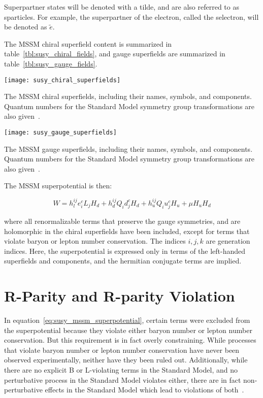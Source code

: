 Superpartner states will be denoted with a tilde, and are also referred to as sparticles.
For example, the superpartner of the electron, called the selectron, will be denoted as $\tilde{e}$.

The MSSM chiral superfield content is summarized in table~\ref{tbl:susy_chiral_fields},
and gauge superfields are summarized in table~\ref{tbl:susy_gauge_fields}.

\begin{table}[!ht]
    \centering
  \texttt{[image: susy\_chiral\_superfields]}
    \caption{The MSSM chiral superfields, including their names, symbols, and components.
  Quantum numbers for the Standard Model symmetry group transformations are also given~\cite{susy-primer-1998}.}
    \label{tbl:susy_chiral_fields}
\end{table}

\begin{table}[!ht]
    \centering

  \texttt{[image: susy\_gauge\_superfields]}
    \caption{The MSSM gauge superfields, including their names, symbols, and components.
  Quantum numbers for the Standard Model symmetry group transformations are also given~\cite{susy-primer-1998}.}\label{tbl:susy_gauge_fields}
\end{table}

The MSSM superpotential is then:

\begin{equation}\label{eq:susy_mssm_superpotential}
    W = h_l^{ij} e_i^c L_j H_d + h_d^{ij} Q_i d_j^c H_d + h_u^{ij} Q_i u_j^c H_u + \mu H_u H_d
\end{equation}

\noindent where all renormalizable terms that preserve the gauge symmetries, and are holomorphic in the chiral superfields have been included,
except for terms that violate baryon or lepton number conservation.
The indices $i, j, k$ are generation indices.
Here, the superpotential is expressed only in terms of the left-handed superfields and components,
and the hermitian conjugate terms are implied.

\section{R-Parity and R-parity Violation}\label{sec:susy_rpv}

In equation~\ref{eq:susy_mssm_superpotential}, certain terms were excluded from the superpotential because they
violate either baryon number or lepton number conservation.
But this requirement is in fact overly constraining.
While processes that violate baryon number or lepton number conservation have never been observed experimentally,
neither have they been ruled out.
Additionally, while there are no explicit B or L-violating terms in the Standard Model,
and no perturbative process in the Standard Model violates either,
there are in fact non-perturbative effects in the Standard Model which lead to violations of both~\cite{susy-bl-violation}.

